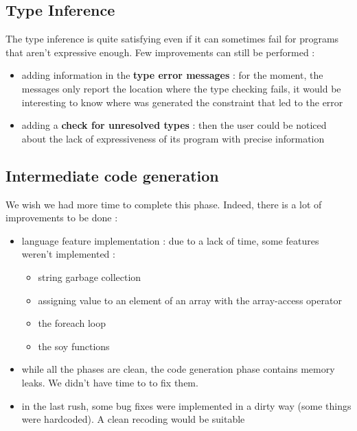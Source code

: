 \documentclass[a4paper,11pt]{article}
\begin{document}
\subsection{Type Inference}
The type inference is quite satisfying even if it can sometimes fail for programs that aren't expressive enough. Few improvements can still be performed :
\begin{itemize}
	\item adding information in the \textbf{type error messages} : for the moment, the messages only report the location where the type checking fails, it would be interesting to know where was generated the constraint that led to the error
	\item adding a \textbf{check for unresolved types} : then the user could be noticed about the lack of expressiveness of its program with precise information
\end{itemize} 
\subsection{Intermediate code generation}
We wish we had more time to complete this phase. Indeed, there is a lot of improvements to be done :
\begin{itemize}
	\item language feature implementation : due to a lack of time, some features weren't implemented :
	\begin{itemize}
		\item string garbage collection
		\item assigning value to an element of an array with the array-access operator 
		\item the foreach loop
		\item the soy functions
	\end{itemize}
	\item while all the phases are clean, the code generation phase contains memory leaks. We didn't have time to to fix them.
	\item in the last rush, some bug fixes were implemented in a dirty way (some things were hardcoded). A clean recoding would be suitable
\end{itemize}
\end{document}
